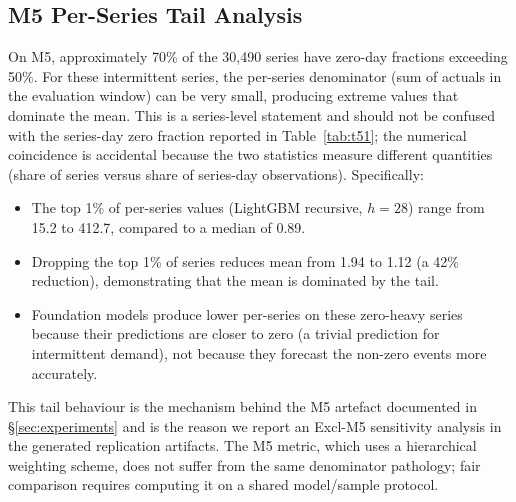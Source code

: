 \subsection{M5 Per-Series \WAPE{} Tail Analysis}

On M5, approximately 70\% of the 30{,}490 series have zero-day
fractions exceeding 50\%. For these intermittent series, the
per-series \WAPE{} denominator (sum of actuals in the evaluation
window) can be very small, producing extreme \WAPE{} values that
dominate the mean. This is a series-level statement and should not be
confused with the series-day zero fraction reported in Table~\ref{tab:t51};
the numerical coincidence is accidental because the two statistics measure
different quantities (share of series versus share of series-day observations).
Specifically:

\begin{itemize}[nosep]
  \item The top 1\% of per-series \WAPE{} values (LightGBM recursive,
    $h = 28$) range from 15.2 to 412.7, compared to a median of 0.89.
  \item Dropping the top 1\% of series reduces mean \WAPE{} from 1.94
    to 1.12 (a 42\% reduction), demonstrating that the mean is dominated
    by the tail.
  \item Foundation models produce lower per-series \WAPE{} on these
    zero-heavy series because their predictions are closer to zero
    (a trivial prediction for intermittent demand), not because they
    forecast the non-zero events more accurately.
\end{itemize}

This tail behaviour is the mechanism behind the M5 \WAPE{} artefact
documented in \S\ref{sec:experiments} and is the reason we report an Excl-M5 sensitivity
analysis in the generated replication artifacts.
The M5 \WRMSSE{} metric, which uses a hierarchical weighting scheme, does
not suffer from the same denominator pathology; fair comparison requires
computing it on a shared model/sample protocol.
